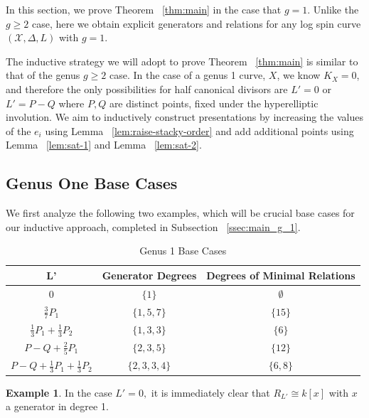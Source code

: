 \documentclass{amsart}
\theoremstyle{plain}
\theoremstyle{definition}
\newtheorem{example}[thm]{Example}
\theoremstyle{remark}
\numberwithin{equation}{section}
\newcommand\ssec{\subsection}
\newcommand \sx{\mathscr X}
\newcommand \halfcan{L}
\begin{document}
In this section, we prove Theorem ~\ref{thm:main} in the case that $g = 1$. Unlike the $g \geq 2$ case, here we obtain explicit generators and relations for any log spin curve $(\sx, \Delta, L)$ with $g = 1$.

The inductive strategy we will adopt to prove Theorem ~\ref{thm:main} is similar to that of the genus $g \geq 2$ case. In the case of a genus 1 curve, $X$, we know $K_X = 0$, and therefore the only possibilities for half canonical divisors are $\halfcan' = 0$ or $\halfcan' = P - Q$ where $P,Q$ are distinct points, fixed  under the hyperelliptic involution. We aim to inductively construct presentations by increasing the values of the $e_i$ using Lemma ~\ref{lem:raise-stacky-order} and add additional points using Lemma ~\ref{lem:sat-1} and Lemma ~\ref{lem:sat-2}.

\ssec{Genus One Base Cases}
\label{ssec:g_1_base}

We first analyze the following two examples, which will be crucial base cases for our inductive approach, completed in Subsection ~\ref{ssec:main_g_1}.

\begin{longtable}	{| c || c | c |}
	\caption{Genus 1 Base Cases}
	\label{table:g-1-base}
	
	\tabularnewline
	
	\hline
	L' & Generator Degrees & Degrees of Minimal Relations \\
	\hline
	\hline
	$0$ & $\{1\}$ & $\emptyset$ \\	\hline

	$\frac{3}{7}P_1$ & $\{1,5,7\}$ & $\{15\}$ \\	\hline
	
	$\frac{1}{3}P_1 + \frac{1}{3}P_2$ & $\{1, 3, 3\}$ & $\{6\}$ \\	\hline
	
	$P - Q + \frac{2}{5}P_1$ & $\{2,3,5\}$ & $\{12\}$ \\	\hline
	
	$P - Q + \frac{1}{3}P_1 + \frac{1}{3}P_2$ & $\{2, 3, 3, 4\}$ & $\{6,8\}$ \\	\hline
	
\end{longtable}


\begin{example}
\label{eg:base-1-0}
In the case $\halfcan' = 0,$ it is immediately clear that $R_{\halfcan'} \cong k[x]$ with $x$ a generator in degree 1.
\end{example}
\end{document}
